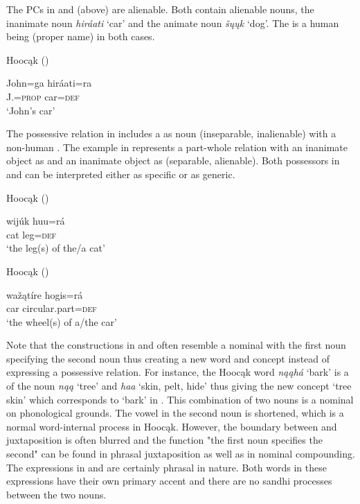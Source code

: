 \documentclass[output=paper]{LSP/langsci}
\begin{document}
The PCs in  and  (above) are alienable. Both contain alienable  nouns, the inanimate noun \textit{hiráati} `car' and the animate noun \textit{šųųk} `dog'. The  is a human being (proper name) in both cases. 

\ea {}Hoocąk (\citealt[13]{Helmbrecht2003}) \label{johnscar}

\gll John=ga      hiráati=ra \\
J.=\textsc{prop} car=\textsc{def} \\
\glt `John's car'
\z

The possessive relation in  includes a  as  noun (inseparable, inalienable) with a non-human . The example in  represents a part-whole relation with an inanimate object as  and an inanimate object as  (separable, alienable). Both possessors in  and  can be interpreted either as specific or as generic. 

\ea {}Hoocąk (\citealt[13]{Helmbrecht2003}) \label{leg}

\gll wijúk huu=rá \\
cat      leg=\textsc{def} \\
\glt `the leg(s) of the/a cat'
\z

\ea {}Hoocąk (\citealt[13]{Helmbrecht2003}) \label{wheel}

\gll waž\k{a}tíre hogis=rá \\
car  circular.part=\textsc{def} \\
\glt `the wheel(s) of a/the car'
\z

Note that the constructions in  and  often resemble a nominal  with the first noun specifying the second noun thus creating a new word and concept instead of expressing a possessive relation. For instance, the Hoocąk word \textit{n\k{a}\k{a}h\'a} `bark' is a  of the noun \textit{n\k{a}\k{a}} `tree' and \textit{haa} `skin, pelt, hide' thus giving the new concept `tree skin' which corresponds to `bark' in . This combination of two nouns is a nominal  on phonological grounds. The vowel in the second noun is shortened, which is a normal word-internal process in Hoocąk. However, the boundary between  and juxtaposition is often blurred and the function "the first noun specifies the second" can be found in phrasal juxtaposition as well as in nominal compounding. The expressions in  and  are certainly phrasal in nature. Both words in these expressions have their own primary accent and there are no sandhi processes between the two nouns. 
\end{document}
